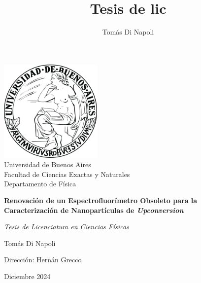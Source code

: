 \documentclass[12pt]{report}
\title{Tesis de lic}
\author{Tomás Di Napoli}
\begin{document}

\thispagestyle{empty}
\begin{center}

{\includegraphics[width=5cm]{UBA_logo.png}\\}
\vspace*{2mm}
{\large Universidad de Buenos Aires\\}
{\large Facultad de Ciencias Exactas y Naturales\\}
{\large Departamento de Física\\}


\vspace*{2cm}
{\huge \bf Renovación de un Espectrofluorímetro Obsoleto para la Caracterización de Nanopartículas de \textit{Upconversion}}


\vspace*{1cm}
{\it {\large Tesis de Licenciatura en Ciencias Físicas} 
}

\vspace*{0.8cm}


\vspace*{6mm}
{\Large Tomás Di Napoli \\}

\vspace*{10mm}
{\large Dirección: Hernán Grecco\\}
\vspace*{5mm}

\vspace*{5mm}
{\large Diciembre 2024\\}
\end{center}
\end{document}
